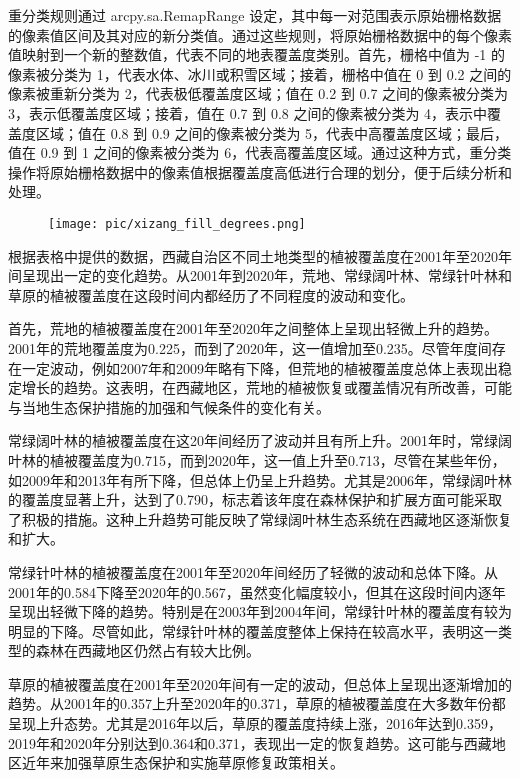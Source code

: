 \documentclass{article}
\begin{document}
				
		\par
		重分类规则通过 arcpy.sa.RemapRange 设定，其中每一对范围表示原始栅格数据的像素值区间及其对应的新分类值。通过这些规则，将原始栅格数据中的每个像素值映射到一个新的整数值，代表不同的地表覆盖度类别。首先，栅格中值为 -1 的像素被分类为 1，代表水体、冰川或积雪区域；接着，栅格中值在 0 到 0.2 之间的像素被重新分类为 2，代表极低覆盖度区域；值在 0.2 到 0.7 之间的像素被分类为 3，表示低覆盖度区域；接着，值在 0.7 到 0.8 之间的像素被分类为 4，表示中覆盖度区域；值在 0.8 到 0.9 之间的像素被分类为 5，代表中高覆盖度区域；最后，值在 0.9 到 1 之间的像素被分类为 6，代表高覆盖度区域。通过这种方式，重分类操作将原始栅格数据中的像素值根据覆盖度高低进行合理的划分，便于后续分析和处理。
		\begin{figure}[H]  %
			\centering
			\texttt{[image: pic/xizang\_fill\_degrees.png]} %
		\end{figure}
				\par 根据表格中提供的数据，西藏自治区不同土地类型的植被覆盖度在2001年至2020年间呈现出一定的变化趋势。从2001年到2020年，荒地、常绿阔叶林、常绿针叶林和草原的植被覆盖度在这段时间内都经历了不同程度的波动和变化。
				
				首先，荒地的植被覆盖度在2001年至2020年之间整体上呈现出轻微上升的趋势。2001年的荒地覆盖度为0.225，而到了2020年，这一值增加至0.235。尽管年度间存在一定波动，例如2007年和2009年略有下降，但荒地的植被覆盖度总体上表现出稳定增长的趋势。这表明，在西藏地区，荒地的植被恢复或覆盖情况有所改善，可能与当地生态保护措施的加强和气候条件的变化有关。
				
				常绿阔叶林的植被覆盖度在这20年间经历了波动并且有所上升。2001年时，常绿阔叶林的植被覆盖度为0.715，而到2020年，这一值上升至0.713，尽管在某些年份，如2009年和2013年有所下降，但总体上仍呈上升趋势。尤其是2006年，常绿阔叶林的覆盖度显著上升，达到了0.790，标志着该年度在森林保护和扩展方面可能采取了积极的措施。这种上升趋势可能反映了常绿阔叶林生态系统在西藏地区逐渐恢复和扩大。
				
				常绿针叶林的植被覆盖度在2001年至2020年间经历了轻微的波动和总体下降。从2001年的0.584下降至2020年的0.567，虽然变化幅度较小，但其在这段时间内逐年呈现出轻微下降的趋势。特别是在2003年到2004年间，常绿针叶林的覆盖度有较为明显的下降。尽管如此，常绿针叶林的覆盖度整体上保持在较高水平，表明这一类型的森林在西藏地区仍然占有较大比例。
				
				草原的植被覆盖度在2001年至2020年间有一定的波动，但总体上呈现出逐渐增加的趋势。从2001年的0.357上升至2020年的0.371，草原的植被覆盖度在大多数年份都呈现上升态势。尤其是2016年以后，草原的覆盖度持续上涨，2016年达到0.359，2019年和2020年分别达到0.364和0.371，表现出一定的恢复趋势。这可能与西藏地区近年来加强草原生态保护和实施草原修复政策相关。
				
\end{document}
